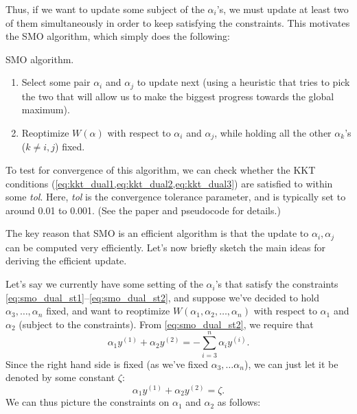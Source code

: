 Thus, if we want to update some subject of the $\alpha_i$'s, we must update at
least two of them simultaneously in order to keep satisfying the constraints.
This motivates the SMO algorithm, which simply does the following:
\begin{algorithm}[ht]
    \caption{SMO algorithm.}
    \label{alg:smo}
    \begin{algorithmic}
    \Repeat
        \begin{enumerate}
            \item Select some pair $\alpha_i$ and $\alpha_j$ to update next (using a heuristic that tries to pick the two that will allow us to make the biggest progress towards the global maximum).
            \item Reoptimize $W(\alpha)$ with respect to $\alpha_i$ and $\alpha_j$, while holding all the other $\alpha_k$'s ($k \ne i,j$) fixed.
        \end{enumerate}
    \end{algorithmic}
\end{algorithm}

To test for convergence of this algorithm, we can check whether the KKT
conditions (\cref{eq:kkt_dual1,eq:kkt_dual2,eq:kkt_dual3}) are satisfied to within some \textit{tol}. Here, \textit{tol} is
the convergence tolerance parameter, and is typically set to around 0.01 to
0.001. (See the paper and pseudocode for details.)

The key reason that SMO is an efficient algorithm is that the update to
$\alpha_i , \alpha_j$ can be computed very efficiently. Let's now briefly sketch the main
ideas for deriving the efficient update.

Let's say we currently have some setting of the $\alpha_i$'s that satisfy the constraints \ref{eq:smo_dual_st1}--\ref{eq:smo_dual_st2}, and suppose we've decided to hold $\alpha_3 ,\ldots,\alpha_n$ fixed, and
want to reoptimize $W(\alpha_1 ,\alpha_2 ,\ldots,\alpha_n )$ with respect to $\alpha_1$ and $\alpha_2$ (subject to
the constraints). From \cref{eq:smo_dual_st2}, we require that
\begin{equation*}
    \alpha_1 y^{(1)} + \alpha_2 y^{(2)} = -\sum_{i=3}^n \alpha_i y^{(i)}.
\end{equation*}
Since the right hand side is fixed (as we've fixed $\alpha_3 ,\ldots\alpha_n$), we can just let
it be denoted by some constant $\zeta$:
\begin{equation*}
    \alpha_1 y^{(1)} + \alpha_2 y^{(2)} = \zeta\label{eq:alpha_zeta}.
\end{equation*}
We can thus picture the constraints on $\alpha_1$ and $\alpha_2$ as follows:

